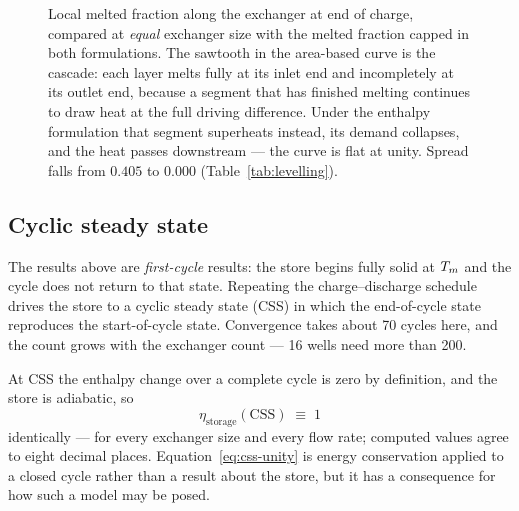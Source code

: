 \begin{figure}[htbp]
\caption{Local melted fraction along the exchanger at end of charge, compared
at \emph{equal} exchanger size with the melted fraction capped in both
formulations. The sawtooth in the area-based curve is the cascade: each layer
melts fully at its inlet end and incompletely at its outlet end, because a
segment that has finished melting continues to draw heat at the full driving
difference. Under the enthalpy formulation that segment superheats instead, its
demand collapses, and the heat passes downstream --- the curve is flat at
unity. Spread falls from $0.405$ to $0.000$ (Table~\ref{tab:levelling}).}
\label{fig:levelling}
\end{figure}



\subsection{Cyclic steady state}
\label{sec:css}

The results above are \emph{first-cycle} results: the store begins fully solid
at $T_{m}$ and the cycle does not return to that state. Repeating the
charge--discharge schedule drives the store to a cyclic steady state (CSS) in
which the end-of-cycle state reproduces the start-of-cycle state. Convergence
takes about \num{70} cycles here, and the count grows with the exchanger count --- \num{16} wells need more than \num{200}.

At CSS the enthalpy change over a complete cycle is zero by definition, and the
store is adiabatic, so
\begin{equation}
  \eta_{\mathrm{storage}}(\mathrm{CSS}) \;\equiv\; 1
  \label{eq:css-unity}
\end{equation}
identically --- for every exchanger size and every flow rate; computed values
agree to eight decimal places. Equation~\eqref{eq:css-unity} is energy
conservation applied to a closed cycle rather than a result about the store, but
it has a consequence for how such a model may be posed.

